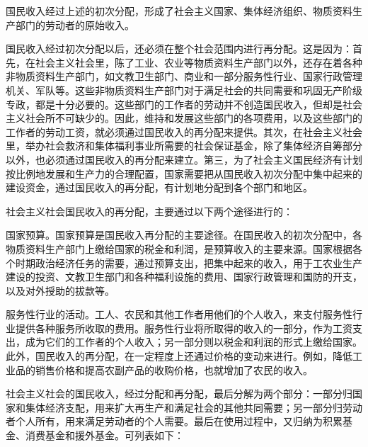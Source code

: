 \documentclass{book}
\begin{document}
国民收入经过上述的初次分配，形成了社会主义国家、集体经济组织、物质资料生产部门的劳动者的原始收入。

国民收入经过初次分配以后，还必须在整个社会范围内进行再分配。这是因为：首先，在社会主义社会里，陈了工业、农业等物质资料生产部门以外，还存在着各种非物质资料生产部门，如文教卫生部门、商业和一部分服务性行业、国家行政管理机关、军队等。这些非物质资料生产部门对于满足社会的共同需要和巩固无产阶级专政，都是十分必要的。这些部门的工作者的劳动并不创造国民收入，但却是社会主义社会所不可缺少的。因此，维持和发展这些部门的各项费用，以及这些部门的工作者的劳动工资，就必须通过国民收入的再分配来提供。其次，在社会主义社会里，举办社会救济和集体福利事业所需要的社会保证基金，除了集体经济自筹部分以外，也必须通过国民收入的再分配来建立。第三，为了社会主义国民经济有计划按比例地发展和生产力的合理配置，国家需要把从国民收入初次分配中集中起来的建设资金，通过国民收入的再分配，有计划地分配到各个部门和地区。

社会主义社会国民收入的再分配，主要通过以下两个途径进行的：

国家预算。国家预算是国民收入再分配的主要途径。在国民收入的初次分配中，各物质资料生产部门上缴给国家的税金和利润，是预算收入的主要来源。国家根据各个时期政治经济任务的需要，通过预算支出，把集中起来的收入，用于工农业生产建设的投资、文教卫生部门和各种福利设施的费用、国家行政管理和国防的开支，以及对外授助的拔款等。

服务性行业的活动。工人、农民和其他工作者用他们的个人收入，来支付服务性行业提供各种服务所收取的费用。服务性行业将所取得的收入的一部分，作为工资支出，成为它们的工作者的个人收入；另一部分则以税金和利润的形式上缴给国家。此外，国民收入的再分配，在一定程度上还通过价格的变动来进行。例如，降低工业品的销售价格和提高农副产品的收购价格，也就增加了农民的收入。

社会主义社会的国民收入，经过分配和再分配，最后分解为两个部分：一部分归国家和集体经济支配，用来扩大再生产和满足社会的其他共同需要；另一部分归劳动者个人所有，用来满足劳动者的个人需要。最后在使用过程中，又归纳为积累基金、消费基金和援外基金。可列表如下：
\end{document}

